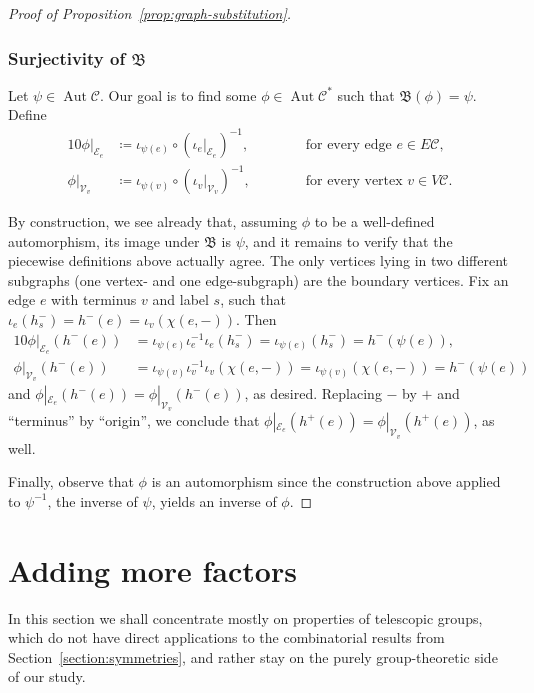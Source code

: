 \documentclass[ALCO,ThmDefs,Unicode,epreuves]{cedram}
\newcommand{\cC}{\mathcal{C}}
\newcommand{\cV}{\mathcal{V}}
\newcommand{\cE}{\mathcal{E}}
\DeclareMathOperator{\aut}{Aut}
\newcommand{\Con}{\mathfrak{B}}
\begin{document}
\begin{proof}[Proof of Proposition~\ref{prop:graph-substitution}]

\subsubsection*{Surjectivity of $\Con$} Let ${\psi}\in \aut \cC$. Our goal is to find some ${\phi}\in \aut\cC^*$ such that $\Con({\phi}) = {\psi}$.
Define
\begin{alignat*}{10}
{\phi}|_{\cE_e} &\coloneqq {\iota}_{{\psi}(e)}{\circ}({\iota}_e|_{\cE_e})^{-1}, \qquad& &\text{ for every edge } e \in E\cC,\\
{\phi}|_{\cV_v} &\coloneqq {\iota}_{{\psi}(v)}{\circ}({\iota}_v|_{\cV_v})^{-1}, \qquad &&\text{ for every vertex } v \in V\cC.
\end{alignat*}
 
By construction, we see already that, assuming ${\phi}$ to be a well-defined automorphism, its image under $\Con$ is ${\psi}$, and it remains to verify that the piecewise definitions above actually agree. The only vertices lying in two different subgraphs (one vertex- and one edge-subgraph) are the boundary vertices. Fix an edge $e$ with terminus $v$ and label $s$, such that ${\iota}_e(h_s^{-}) = h^{-}(e) = {\iota}_v({\chi}(e, -))$. Then
\begin{alignat*}{10}
{\phi}|_{\cE_e}(h^{-}(e)) &= {\iota}_{{\psi}(e)}{\iota}_e^{-1}{\iota}_e(h_s^{-}) = {\iota}_{{\psi}(e)}(h_s^{-}) = h^{-}({\psi}(e)),\\
{\phi}|_{\cV_v}(h^{-}(e)) &= {\iota}_{{\psi}(v)}{\iota}_v^{-1}{\iota}_v({\chi}(e, -)) = {\iota}_{{\psi}(v)}({\chi}(e, -)) = h^{-}({\psi}(e))
\end{alignat*}
and ${\phi}|_{\cE_e}(h^{-}(e)) = {\phi}|_{\cV_v}(h^{-}(e))$, as desired. Replacing $-$ by $+$ and ``terminus'' by ``origin'', we conclude that ${\phi}|_{\cE_e}(h^{+}(e)) = {\phi}|_{\cV_v}(h^{+}(e))$, as well.
 
Finally, observe that ${\phi}$ is an automorphism since the construction above applied to ${\psi}^{-1}$, the inverse of $\psi$, yields an inverse of ${\phi}$.\end{proof}

\section{Adding more factors}

In this section we shall concentrate mostly on properties of telescopic groups, which do not have direct applications to the combinatorial results from Section~\ref{section:symmetries}, and rather stay on the purely group-theoretic side of our study.
\end{document}
